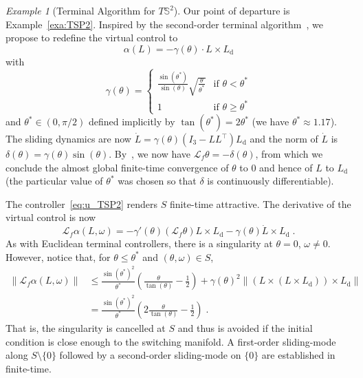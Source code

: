 \documentclass{article}
\theoremstyle{definition}
\theoremstyle{remark}
\newtheorem{example}{Example}
\newcommand{\lie}{\mathcal{L}}	%
\newcommand{\rd}{\mathrm{d}}	%
\newcommand{\SP}{\mathbb{S}}	%
\newcommand{\SW}{S}	%
\begin{document}
\begin{example}[Terminal Algorithm for $T\SP^2$]
 Our point of departure is Example~\ref{exa:TSP2}.  Inspired by the second-order terminal algorithm~\cite{venkataraman1993}, we 
 propose to redefine the virtual control to
 \begin{equation} \label{eq:virtual_TSP2}
  \alpha(L) = -\gamma(\theta)\cdot L\times L_\rd
 \end{equation}
 with
 \begin{displaymath}
   \gamma(\theta) =
   \begin{cases}
    \frac{\sin(\theta^*)}{\sin(\theta)}\sqrt{\frac{\theta}{\theta^*}} & \text{if $\theta < \theta^*$} \\
    1 & \text{if $\theta \ge \theta^*$}
   \end{cases}
 \end{displaymath}
 and $\theta^* \in (0, \pi/2)$ defined implicitly by $\tan(\theta^*)=2\theta^*$ (we have $\theta^* \approx 1.17$). 
 The sliding dynamics are now $\dot{L} = \gamma(\theta)(I_3 - LL^\top)L_\rd$ and the norm of $\dot{L}$ is 
 $\delta(\theta) = \gamma(\theta)\sin(\theta)$. By~\cite[Lem. 1]{bullo1995}, we now have $\lie_f \theta = -\delta(\theta)$,
 from which we conclude the almost global finite-time convergence of $\theta$ to 0 and hence of $L$ to $L_\rd$ 
 (the particular value of $\theta^*$ was chosen so that $\delta$ is continuously differentiable).

 The controller~\eqref{eq:u_TSP2} renders $\SW$ finite-time attractive. The derivative of the virtual control is now
 \begin{displaymath}
  \lie_f {\alpha}(L,\omega) = -\gamma'(\theta)(\lie_f \theta) L\times L_\rd - \gamma(\theta) \dot{L}\times L_\rd \;. 
 \end{displaymath}
 As with Euclidean terminal controllers, there is a singularity at $\theta = 0$, $\omega \neq 0$. However, notice that, for
 $\theta \le \theta^*$ and $(\theta,\omega) \in \SW$,
 \begin{align*}
  \|\lie_f \alpha(L,\omega)\| &\le \frac{\sin(\theta^*)^2}{\theta^*} \left( \frac{\theta}{\tan(\theta)} - \frac{1}{2} \right) +
    \gamma(\theta)^2 \| (L\times(L\times L_\rd))\times L_\rd \| \\
                             &= \frac{\sin(\theta^*)^2}{\theta^*} \left( 2\frac{\theta}{\tan(\theta)} - \frac{1}{2}\right) \;.
 \end{align*}
 That is, the singularity is cancelled at $\SW$ and thus is avoided if the initial condition is close
 enough to the switching manifold. A first-order sliding-mode along $\SW\setminus\{0\}$ followed by a second-order
 sliding-mode on $\{0\}$ are established in finite-time.


\end{example}
\end{document}
